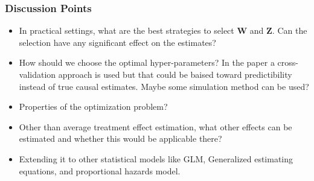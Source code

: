 \documentclass{beamer}
\begin{document}

% 
% 

\begin{frame}
	\frametitle{Discussion Points}
	\begin{itemize}
		\item In practical settings, what are the best strategies to
			select $ \bm{W} $ and $ \bm{Z} $. Can the selection
			have any significant effect on the estimates?
		\item How should we choose the optimal hyper-parameters? In
			the paper a cross-validation approach is used but that could be baised
			toward predictibility instead of true causal estimates. Maybe some simulation
			method can be used?

		\item Properties of the optimization problem?
		\item Other than average treatment effect estimation, what other effects can be estimated and whether this would be applicable there?
		\item Extending it to other statistical models like GLM, Generalized estimating equations, and proportional hazards model.
	\end{itemize}
\end{frame}
\end{document}
